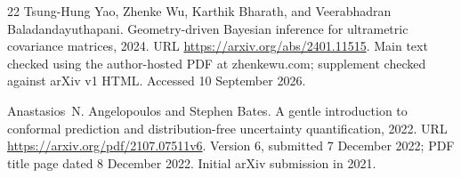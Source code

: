 \documentclass[UTF8,11pt,fontset=fandol]{ctexart}
\theoremstyle{remark}
\numberwithin{equation}{section}
\begin{document}
\begin{thebibliography}{22}
Tsung-Hung Yao, Zhenke Wu, Karthik Bharath, and Veerabhadran
  Baladandayuthapani.
\newblock Geometry-driven {Bayesian} inference for ultrametric covariance
  matrices, 2024.
\newblock URL \url{https://arxiv.org/abs/2401.11515}.
\newblock Main text checked using the author-hosted PDF at zhenkewu.com;
  supplement checked against arXiv v1 HTML. Accessed 10 September 2026.

Anastasios~N. Angelopoulos and Stephen Bates.
\newblock A gentle introduction to conformal prediction and distribution-free
  uncertainty quantification, 2022.
\newblock URL \url{https://arxiv.org/pdf/2107.07511v6}.
\newblock Version 6, submitted 7 December 2022; PDF title page dated 8 December
  2022. Initial arXiv submission in 2021.

\end{thebibliography}
\end{document}
